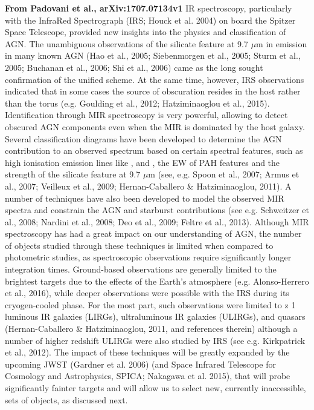 {\bf From Padovani et al.,  arXiv:1707.07134v1}
IR spectroscopy, particularly with the InfraRed Spectrograph (IRS;
Houck et al. 2004) on board the Spitzer Space Telescope, provided new
insights into the physics and classification of AGN. The unambiguous
observations of the silicate feature at 9.7 $\mu$m in emission in many
known AGN (Hao et al., 2005; Siebenmorgen et al., 2005; Sturm et al.,
2005; Buchanan et al., 2006; Shi et al., 2006) came as the long sought
confirmation of the unified scheme. At the same time, however, IRS
observations indicated that in some cases the source of obscuration
resides in the host rather than the torus (e.g. Goulding et al., 2012;
Hatziminaoglou et al., 2015).  Identification through MIR spectroscopy
is very powerful, allowing to detect obscured AGN components even
when the MIR is dominated by the host galaxy. Several classification
diagrams have been developed to determine the AGN contribution to an
observed spectrum based on certain spectral features, such as high
ionisation emission lines like \nev, \neii and \oiv, the EW of
PAH features and the strength of the silicate feature at 9.7 $\mu$m (see,
e.g. Spoon et al., 2007; Armus et al., 2007;
Veilleux et al., 2009; Hernan-Caballero \& Hatziminaoglou, 2011). A
number of techniques have also been developed to model the observed
MIR spectra and constrain the AGN and starburst contributions (see
e.g. Schweitzer et al., 2008; Nardini et al., 2008; Deo et al., 2009;
Feltre et al., 2013).  Although MIR spectroscopy has had a great
impact on our understanding of AGN, the number of objects studied
through these techniques is limited when compared to photometric
studies, as spectroscopic observations require significantly longer
integration times. Ground-based observations are generally limited
to the brightest targets due to the effects of the Earth's atmosphere
(e.g. Alonso-Herrero et al., 2016), while deeper observations were
possible with the IRS during its cryogen-cooled phase. For the most
part, such observations were limited to z 1 luminous IR galaxies
(LIRGs), ultraluminous IR galaxies (ULIRGs), and quasars (Hernan-Caballero \& Hatziminaoglou, 2011, and references therein) although a
number of higher redshift ULIRGs were also studied by IRS (see
e.g. Kirkpatrick et al., 2012). The impact of these techniques will be
greatly expanded by the upcoming JWST (Gardner et al. 2006) 
(and Space Infrared Telescope for Cosmology and Astrophysics, SPICA; Nakagawa
et al. 2015), 
that will probe significantly fainter targets and will
allow us to select new, currently inaccessible, sets of objects, as
discussed next.


